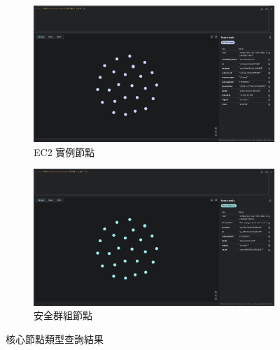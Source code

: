 \documentclass[11pt,a4paper]{ctexart}
\begin{document}
\begin{figure}[H]
\centering
\begin{subfigure}[b]{0.48\textwidth}
\centering
\includegraphics[width=\textwidth]{EC2Instances.png}
\caption{EC2 實例節點}
\label{fig:ec2_nodes}
\end{subfigure}
\hfill
\begin{subfigure}[b]{0.48\textwidth}
\centering
\includegraphics[width=\textwidth]{SecurityGroup.png}
\caption{安全群組節點}
\label{fig:sg_nodes}
\end{subfigure}
\caption{核心節點類型查詢結果}
\label{fig:node_types}
\end{figure}
\end{document}
